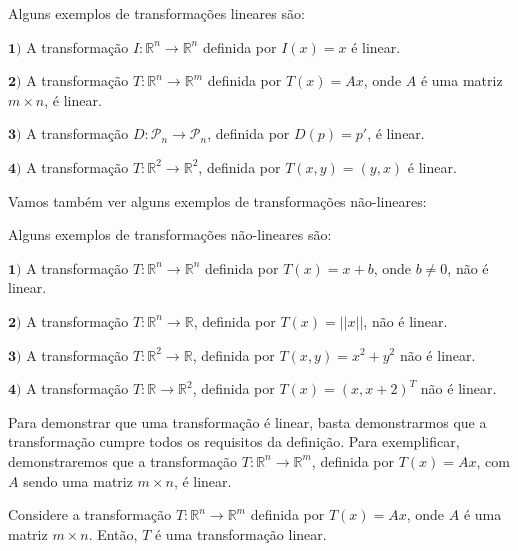 \begin{Example}
	Alguns exemplos de transformações lineares são:
	
	$\mathbf{1)}$ A transformação $I:\mathbb{R}^n\to\mathbb{R}^n$ definida por $I(x) = x$ é linear.
	
	$\mathbf{2)}$ A transformação $T:\mathbb{R}^n\to\mathbb{R}^m$ definida por $T(x) = Ax$, onde $A$ é uma matriz $m\times n$, é linear.
	
	$\mathbf{3)}$ A transformação $D:\mathcal{P}_n\to\mathcal{P}_n$, definida por $D(p) = p'$, é linear.
	
	$\mathbf{4)}$ A transformação $T:\mathbb{R}^2\to\mathbb{R}^2$, definida por $T(x, y) = (y, x)$ é linear.
\end{Example}

Vamos também ver alguns exemplos de transformações não-lineares:

\begin{Example}
	Alguns exemplos de transformações não-lineares são:
	
	$\mathbf{1)}$ A transformação $T:\mathbb{R}^n\to\mathbb{R}^n$ definida por $T(x) = x + b$, onde $b\neq 0$, não é linear.
	
	$\mathbf{2)}$ A transformação $T:\mathbb{R}^n\to\mathbb{R}$, definida por $T(x) = ||x||$, não é linear.
	
	$\mathbf{3)}$ A transformação $T:\mathbb{R}^2\to\mathbb{R}$, definida por $T(x, y) = x^2 + y^2$ não é linear.
	
	$\mathbf{4)}$ A transformação $T:\mathbb{R}\to\mathbb{R}^2$, definida por $T(x) = (x, x + 2)^T$ não é linear.
\end{Example}

Para demonstrar que uma transformação é linear, basta demonstrarmos que a transformação cumpre todos os requisitos da definição. Para exemplificar, demonstraremos que a transformação $T:\mathbb{R}^n\to\mathbb{R}^m$, definida por $T(x) = Ax$, com $A$ sendo uma matriz $m\times n$, é linear.

\begin{Proposition}
	Considere a transformação $T:\mathbb{R}^n\to\mathbb{R}^m$ definida por $T(x) = Ax$, onde $A$ é uma matriz $m\times n$. Então, $T$ é uma transformação linear.
\end{Proposition}

